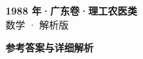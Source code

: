 \documentclass[zihao=-4, a4paper]{ctexart}
\begin{document}
\begin{center}
  {\Large\bfseries 1988 年·广东卷·理工农医类}\\[4pt]
  {\large 数学 · 解析版}
\end{center}
\medskip
{}

\clearpage
{}
\begin{center}{\Large\bfseries 参考答案与详细解析}\end{center}
\medskip

\end{document}
